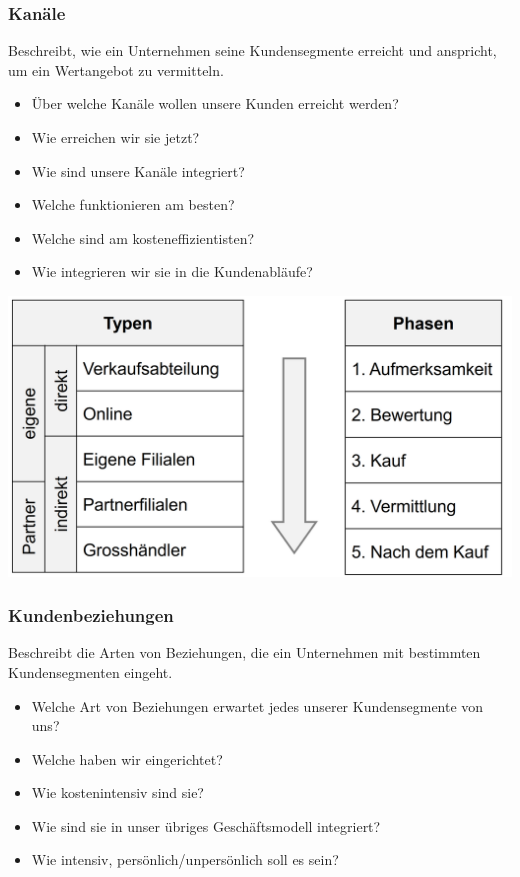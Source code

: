 \subsubsection{Kanäle}
Beschreibt, wie ein Unternehmen seine Kundensegmente erreicht und anspricht, um ein Wertangebot zu vermitteln.
\begin{multicols}{2}	
	\begin{itemize}
		\item Über welche Kanäle wollen unsere Kunden erreicht werden?
		\item Wie erreichen wir sie jetzt?
		\item Wie sind unsere Kanäle integriert?
		\item Welche funktionieren am besten?
		\item Welche sind am kosteneffizientisten?
		\item Wie integrieren wir sie in die Kundenabläufe?
	\end{itemize}

	\includegraphics[width=1\linewidth]{images/Kanaele}
\end{multicols}

\subsubsection{Kundenbeziehungen}
Beschreibt die Arten von Beziehungen, die ein Unternehmen mit bestimmten Kundensegmenten eingeht.
\begin{itemize}
	\item Welche Art von Beziehungen erwartet jedes unserer	Kundensegmente von uns?
	\item Welche haben wir eingerichtet?
	\item Wie kostenintensiv sind sie?
	\item Wie sind sie in unser übriges Geschäftsmodell integriert?
	\item Wie intensiv, persönlich/unpersönlich soll es sein?
\end{itemize}

